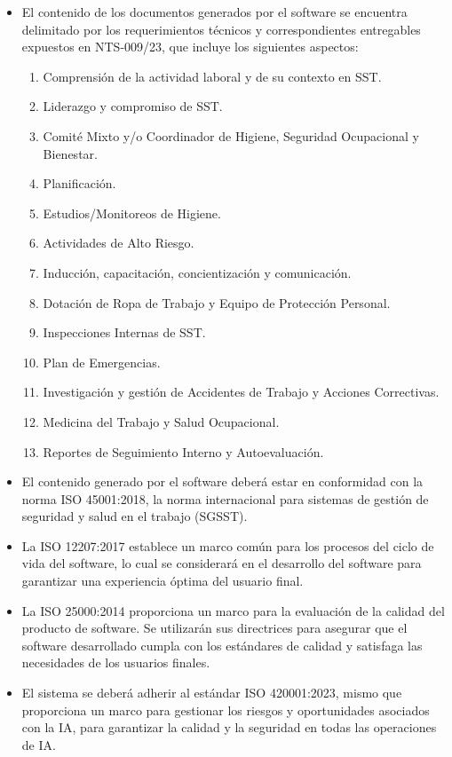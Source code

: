 \begin{itemize}
	\item El contenido de los documentos generados por el software se encuentra delimitado por los requerimientos técnicos y correspondientes entregables expuestos en NTS-009/23, que incluye los siguientes aspectos:
	\begin{enumerate}
		\item Comprensión de la actividad laboral y de su contexto en SST.
		\item Liderazgo y compromiso de SST.
		\item Comité Mixto y/o Coordinador de Higiene, Seguridad Ocupacional y Bienestar.
		\item Planificación.
		\item Estudios/Monitoreos de Higiene.
		\item Actividades de Alto Riesgo.
		\item Inducción, capacitación, concientización y comunicación.
		\item Dotación de Ropa de Trabajo y Equipo de Protección Personal.
		\item Inspecciones Internas de SST.
		\item Plan de Emergencias.
		\item Investigación y gestión de Accidentes de Trabajo y Acciones Correctivas.
		\item Medicina del Trabajo y Salud Ocupacional.
		\item Reportes de Seguimiento Interno y Autoevaluación.
	\end{enumerate}
	\item El contenido generado por el software deberá estar en conformidad con la norma ISO 45001:2018, la norma internacional para sistemas de gestión de seguridad y salud en el trabajo (SGSST).
	\item La ISO 12207:2017 establece un marco común para los procesos del ciclo de vida del software, lo cual se considerará en el desarrollo del software para garantizar una experiencia óptima del usuario final.
	\item La ISO 25000:2014 proporciona un marco para la evaluación de la calidad del producto de software. Se utilizarán sus directrices para asegurar que el software desarrollado cumpla con los estándares de calidad y satisfaga las necesidades de los usuarios finales.
	\item El sistema se deberá adherir al estándar ISO 420001:2023, mismo que proporciona un marco para gestionar los riesgos y oportunidades asociados con la IA, para garantizar la calidad y la seguridad en todas las operaciones de IA.

\end{itemize}
